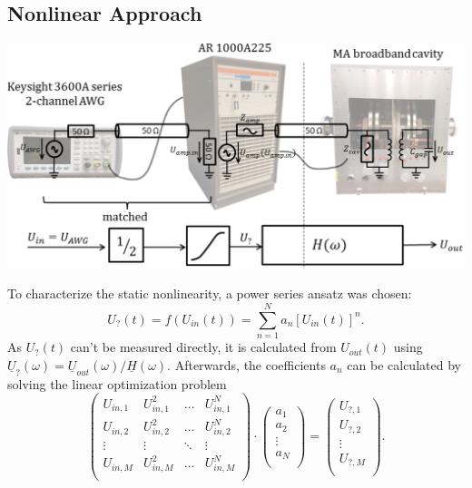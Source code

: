 \documentclass[paper=a0,accentcolor=tud9b,colorbacktitle,colorbacksubtitle]{tudposter}
\begin{document}
\begin{multicols}{2}
	 


	
	\section{Nonlinear Approach}	
	\begin{center}	 
	\includegraphics[scale=1.2]{WEPVA047f2_2.eps}
	\label{Modellierung}
	\end{center}
	 To characterize the static nonlinearity, a power series ansatz was chosen:
	 \vspace{-0.4cm}
	    \begin{equation*}
	    \textstyle
	      U_?(t)=f\left(U_{in}(t)\right)=\sum_{n=1}^N a_n \left[ U_{in}(t) \right]^n.
	      \label{Potenzreihe}
	    \end{equation*}
	 As $\textstyle U_?(t)$ can't be measured directly, it is calculated from $\textstyle U_{out}(t)$ using
	 $\textstyle\underline{U}_?(\omega)=\underline{U}_{out}(\omega)/\underline{H}(\omega)$. Afterwards, the coefficients $a_n$ can be calculated
	 by solving the linear optimization problem
		\begin{equation*}
		\textstyle
	  \left( 
	 \begin{matrix}
	  U_{in,1} & U_{in,1}^2 & \dots & U_{in,1}^N \\
	  U_{in,2} & U_{in,2}^2 & \dots & U_{in,2}^N \\
	  \vdots & \vdots & \ddots & \vdots \\
	  U_{in,M} & U_{in,M}^2 & \dots & U_{in,M}^N \\
	 \end{matrix}
	\right)
	\cdot
	\left(
	\begin{matrix}
	 a_1 \\
	 a_2 \\
	 \vdots \\
	 a_N \\	 
	\end{matrix}
	\right) 
	= \left( 
	\begin{matrix}
	 U_{?,1} \\
	 U_{?,2} \\
	 \vdots \\
	 U_{?,M} \\	 
	\end{matrix}
	\right).
	\label{lgs}
	\end{equation*}
	

\end{multicols}
\end{document}
